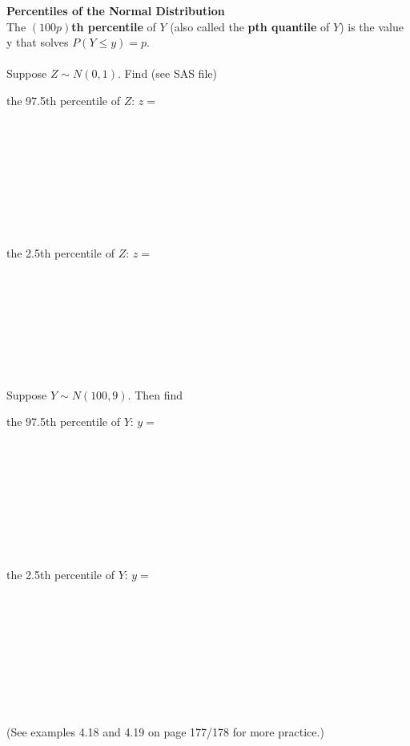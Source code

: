 \pagebreak

\textbf{Percentiles of the Normal Distribution}\\
The \textbf{$(100p)$th percentile} of $Y$ (also called the \textbf{pth quantile} of $Y$) is the value y that solves $P(Y \leq y) = p$. \\~\\
Suppose $Z \sim N(0,1)$. Find (see SAS file)
\be
\item the 97.5th percentile of $Z$: $z=$\\~\\~\\~\\~\\~\\~\\~\\~\\
\item the 2.5th percentile of $Z$: $z=$\\~\\~\\~\\~\\~\\~\\~\\~\\
\ee
Suppose $Y \sim N(100, 9)$. Then find
\be
\item the 97.5th percentile of $Y$: $y=$\\~\\~\\~\\~\\~\\~\\~\\~\\
\item the 2.5th percentile of $Y$: $y=$\\~\\~\\~\\~\\~\\~\\~\\~\\~\\
\ee
(See examples 4.18 and 4.19 on page 177/178 for more practice.)
\pagebreak


